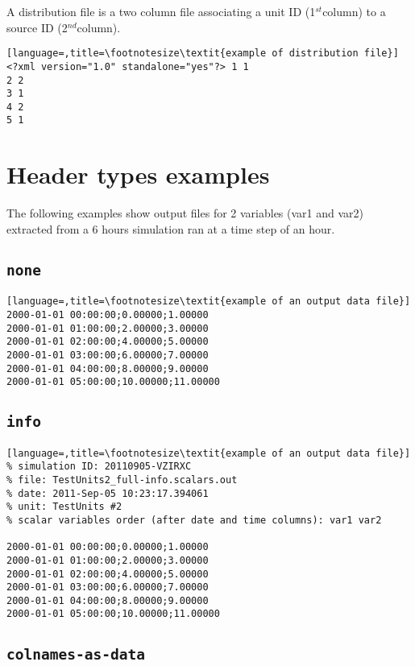 A distribution file is a two column file associating a unit ID
(1$^{st}$column) to a source ID (2$^{nd}$column).
\begin{lstlisting}[language=,title=\footnotesize\textit{example of distribution file}] <?xml version="1.0" standalone="yes"?> 1 1
2 2
3 1
4 2
5 1
\end{lstlisting}




\section{Header types examples}

The following examples show output files for 2 variables (var1 and var2) extracted from a 6
hours simulation ran at a time step of an hour.


\subsection{\texttt{none}}

\begin{lstlisting}[language=,title=\footnotesize\textit{example of an output data file}]
2000-01-01 00:00:00;0.00000;1.00000 
2000-01-01 01:00:00;2.00000;3.00000
2000-01-01 02:00:00;4.00000;5.00000
2000-01-01 03:00:00;6.00000;7.00000
2000-01-01 04:00:00;8.00000;9.00000
2000-01-01 05:00:00;10.00000;11.00000
\end{lstlisting}


\subsection{\texttt{info}}

\begin{lstlisting}[language=,title=\footnotesize\textit{example of an output data file}]
% simulation ID: 20110905-VZIRXC
% file: TestUnits2_full-info.scalars.out
% date: 2011-Sep-05 10:23:17.394061
% unit: TestUnits #2
% scalar variables order (after date and time columns): var1 var2

2000-01-01 00:00:00;0.00000;1.00000 
2000-01-01 01:00:00;2.00000;3.00000
2000-01-01 02:00:00;4.00000;5.00000
2000-01-01 03:00:00;6.00000;7.00000
2000-01-01 04:00:00;8.00000;9.00000
2000-01-01 05:00:00;10.00000;11.00000
\end{lstlisting}


\subsection{\texttt{colnames-as-data}}

